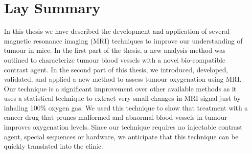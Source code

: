 

\chapter{Lay Summary}

In this thesis we have described the development and application of several magnetic resonance imaging (MRI) techniques to improve our understanding of tumour in mice.
In the first part of the thesis, a new analysis method was outlined to characterize tumour blood vessels with a novel bio-compatible contrast agent.
In the second part of this thesis, we introduced, developed, validated, and applied a new method to assess tumour oxygenation using MRI.
Our technique is a significant improvement over other available methods as it uses a statistical technique to extract very small changes in MRI signal just by inhaling 100\% oxygen gas. 
We used this technique to show that treatment with a cancer drug that prunes malformed and abnormal blood vessels in tumour improves oxygenation levels.
Since our technique requires no injectable contrast agent, special sequences or hardware, we anticipate that this technique can be quickly translated into the clinic. 
